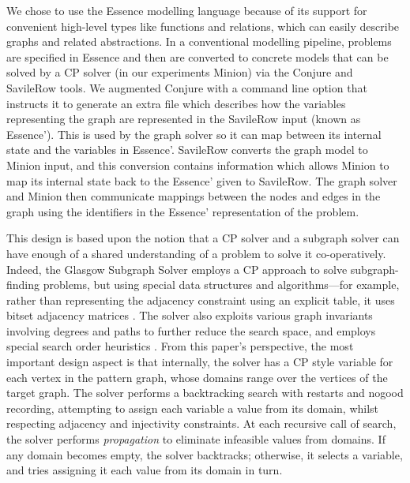 \documentclass[runningheads]{llncs}
\begin{document}
We chose to use the Essence modelling language \cite{DBLP:journals/constraints/FrischHJHM08} because
of its support for convenient high-level types like functions and relations, which can easily
describe graphs and related abstractions. In a conventional modelling pipeline, problems are
specified in Essence and then are converted to concrete models that can be solved by a CP solver (in
our experiments Minion) via the Conjure and SavileRow tools. We augmented Conjure with a command
line option that instructs it to generate an extra file which describes how the variables
representing the graph are represented in the SavileRow input (known as Essence'). This is used by
the graph solver so it can map between its internal state and the variables in Essence'.  SavileRow
converts the graph model to Minion input, and this conversion contains information which allows
Minion to map its internal state back to the Essence' given to SavileRow. The graph solver and
Minion then communicate mappings between the nodes and edges in the graph using the identifiers in
the Essence' representation of the problem.

This design is based upon the notion that a CP solver and a subgraph solver can have enough of a
shared understanding of a problem to solve it co-operatively. Indeed, the Glasgow Subgraph Solver
\cite{DBLP:conf/gg/McCreeshP020} employs a CP approach to solve subgraph-finding problems, but using
special data structures and algorithms---for example, rather than representing the adjacency
constraint using an explicit table, it uses bitset adjacency matrices
\cite{DBLP:conf/cp/McCreeshP15}. The solver also exploits various graph invariants involving degrees
\cite{DBLP:journals/constraints/ZampelliDS10} and paths \cite{DBLP:conf/cp/AudemardLMGP14} to
further reduce the search space, and employs special search order heuristics
\cite{DBLP:conf/cpaior/ArchibaldDHMP019}. From this paper's perspective, the most important design
aspect is that internally, the solver has a CP style variable for each vertex in the pattern graph,
whose domains range over the vertices of the target graph. The solver performs a backtracking search
with restarts and nogood recording, attempting to assign each variable a value from its domain,
whilst respecting adjacency and injectivity constraints. At each recursive call of search, the
solver performs \emph{propagation} to eliminate infeasible values from domains. If any domain
becomes empty, the solver backtracks; otherwise, it selects a variable, and tries assigning it each
value from its domain in turn.
\end{document}
